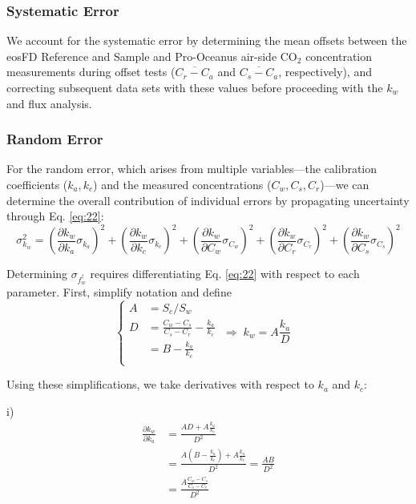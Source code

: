 \documentclass[11pt]{article}
\begin{document}
\subsubsection{Systematic Error}
We account for the systematic error by determining the mean offsets between the eosFD Reference and Sample and Pro-Oceanus air-side CO$_2$ concentration measurements during offset tests ($\overline{C_r - C_a}$ and $\overline{C_s - C_a}$, respectively), and correcting subsequent data sets with these values before proceeding with the $k_w$ and flux analysis.

\subsubsection{Random Error}
For the random error, which arises from multiple variables---the calibration coefficients ($k_a, k_c$) and the measured concentrations ($C_w, C_s, C_r$)---we can determine the overall contribution of individual errors by propagating uncertainty through Eq. \ref{eq:22}:
\begin{equation} \label{eq:29}
	\sigma_{k_w}^2 = 
	\left(\frac{\partial k_w}{\partial k_a}\sigma_{k_a}\right)^2 + \left(\frac{\partial k_w}{\partial k_c}\sigma_{k_c}\right)^2 +
	\left(\frac{\partial k_w}{\partial C_w}\sigma_{C_w}\right)^2 +
	\left(\frac{\partial k_w}{\partial C_r}\sigma_{C_r}\right)^2 +
	\left(\frac{\partial k_w}{\partial C_s}\sigma_{C_s}\right)^2
\end{equation}

Determining $\sigma_{f_w^\dagger}$ requires differentiating Eq. \ref{eq:22} with respect to each parameter. First, simplify notation and define
\begin{equation}
	\left\{
	\begin{aligned}
		A &= S_c/S_w\\
		D &= \frac{C_w - C_s}{C_s - C_r} - \frac{k_a}{k_c}\\
		  &= B - \frac{k_a}{k_c}\\
			\end{aligned}
		\right.
		\;\Longrightarrow\;
		k_w = A \frac{k_a}{D} \quad 
\end{equation}

Using these simplifications, we take derivatives with respect to $k_a$ and $k_c$:

i) 
\begin{equation*}
	\begin{aligned}
	\frac{\partial k_w}{\partial k_a}
	&= \frac{AD + A\frac{k_a}{k_c}}{D^2}\\ 
	&= \frac{A(B-\frac{k_a}{k_c}) + A\frac{k_a}{k_c}}{D^2} = \frac{A B}{D^2}\\
	&= \frac{A \frac{C_w - C_s}{C_s - C_r}}{D^2}
	\end{aligned}
\end{equation*}
\end{document}
